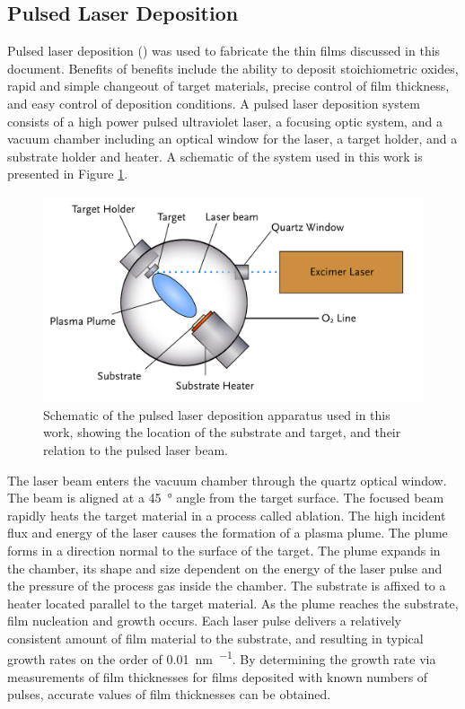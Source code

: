\subsection{Pulsed Laser Deposition}
\label{subsec:exp.pld}


Pulsed laser deposition () was used to fabricate the thin films discussed in
this document. Benefits of  benefits include the ability to deposit
stoichiometric oxides, rapid and simple changeout of target materials, precise control of
film thickness, and easy control of deposition conditions.\cite{Chrisey:1994ta} A pulsed
laser deposition system consists of a high power pulsed ultraviolet laser, a focusing
optic system, and a vacuum chamber including an optical window for the laser, a target
holder, and a substrate holder and heater. A schematic of the system used in this work is
presented in Figure \ref{fig:pldsetup}.
\begin{figure}[b]
	\includegraphics[width=\textwidth]{pldsetup.pdf}
	\caption[Schematic of pulsed laser deposition apparatus]{%
		Schematic of the pulsed laser deposition apparatus used in 
		this work, showing the location of the substrate and target, 
		and their relation to the pulsed laser beam.}
	\label{fig:pldsetup}
\end{figure}
The laser  beam enters the vacuum chamber through the quartz optical window. The beam is
aligned at a \SI{45}{\degree} angle from the target surface. The focused beam rapidly
heats the target material in a process called ablation. The high incident flux and energy
of the laser causes the formation of a plasma plume. The plume forms in a direction normal
to the surface of the target. The plume expands in the chamber, its shape and size
dependent on the energy of the laser pulse and the pressure of the process gas inside the
chamber. The substrate is affixed to a heater located parallel to the target material. As
the plume reaches the substrate, film nucleation and growth occurs. Each laser pulse
delivers a relatively consistent amount of film material to the substrate, and resulting
in typical growth rates on the order of \SI{0.01}{\nano\meter\per\pulse}. By determining
the growth rate via measurements of film thicknesses for films deposited with known
numbers of pulses, accurate values of film thicknesses can be obtained.

